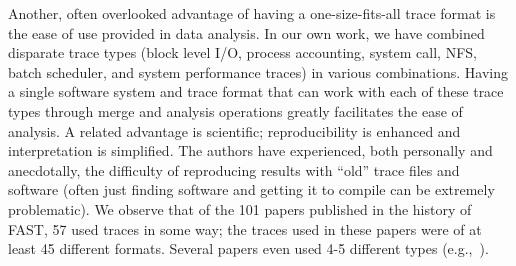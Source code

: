Another, often overlooked advantage of having a one-size-fits-all
trace format is the ease of use provided in data analysis. In our own
work, we have combined disparate trace types (block level I/O, process
accounting, system
call, NFS, batch scheduler, and system performance 
traces)
in various combinations. Having a single software system and trace
format that can work with each of these trace types through merge and
analysis operations greatly facilitates the ease of analysis. A
related advantage is scientific; reproducibility is enhanced and 
interpretation is simplified.
The authors have experienced, both personally and
anecdotally, the difficulty of reproducing results with ``old'' trace
files and software (often just finding software and getting it to compile
can be extremely problematic). We observe that of the 101 papers
published in the history of FAST, 57 used traces in some way; 
the traces used in these papers were of at least 45 different formats. 
Several
papers even used 4-5 different types (e.g.,~\cite{arc03, ellard03}).

